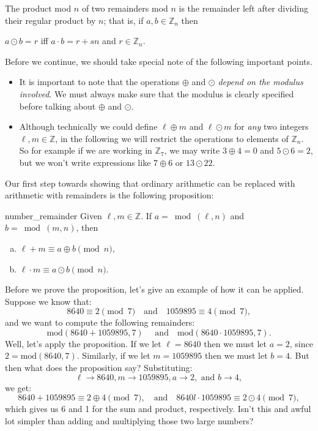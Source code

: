 \begin{defn}\label{definition:modular:mod_mult}

\noindent
The product mod $n$ of two remainders mod $n$ is the remainder left after dividing their regular product by $n$; that is, if $a,b \in {\mathbb Z}_n$ then

\begin{center}
$a \odot b = r$ iff  $a \cdot b = r + sn$ and 
$r \in {\mathbb Z}_n.$
\end{center}
\end{defn}
Before we continue, we should take special note of the following important points.

\begin{rem}
\begin{itemize}
\item
It is important to note that the operations $\oplus$ and $\odot$ \emph{depend on the modulus involved}. We must always make sure that the modulus is clearly specified before talking about $\oplus$ and $\odot$.
\item
Although technically we could define $\ell \oplus m$ and $\ell \odot m$ for \emph{any} two integers $\ell,m \in \mathbb{Z}$, in the following we will restrict the operations to elements of  $ \mathbb{Z}_n$.  So for example  if we are working in $\mathbb{Z}_7$, we may write $3 \oplus 4 = 0$ and $5 \odot 6 = 2$, but we won't write expressions like $7 \oplus 6$ or $13 \odot 22$.
\end{itemize}
\end{rem}

Our first step towards showing that ordinary arithmetic can be replaced with arithmetic with remainders is the following proposition:

\begin{prop}{number_remainder}
Given $\ell,m \in {\mathbb Z}$. If $a =\bmod(\ell,n)$ and $b=\bmod(m,n)$, then 
\begin{enumerate}[(a)]
\item
$\ell+ m \equiv a \oplus b \pmod{n}$, 
\item
$\ell \cdot m \equiv a \odot b \pmod{n}$.
\end{enumerate}
\end{prop}

Before we prove the proposition, let's give an example of how it can be applied. Suppose we know that:
\[   8640 \equiv 2 \pmod{7} \quad \text{and} \quad 1059895 \equiv  4 \pmod{7},
\] 
and we want to compute the following remainders: 
\[
\text{mod}(8640 + 1059895,7) \quad \text{ and} \quad  \text{mod}(8640 \cdot 1059895, 7).
\]  
Well, let's apply the proposition. If we let $\ell=8640$ then we must let $a=2$, since $2=\text{mod}(8640,7)$. Similarly, if we let $m=1059895$ then we must let $b=4$. But then what does the proposition say? Substituting: 
\[
\ell \rightarrow 8640, m \rightarrow 1059895, a \rightarrow 2, \text{ and } b \rightarrow 4,
\]
we get:
\[
8640+ 1059895 \equiv 2 \oplus 4 \pmod{7}, \quad \text{and} \quad 8640l \cdot 1059895 \equiv 2 \odot 4 \pmod{7},
\]
which gives us 6 and 1  for the sum and product, respectively.  Isn't this  and awful lot simpler than adding and multiplying those two large numbers?

